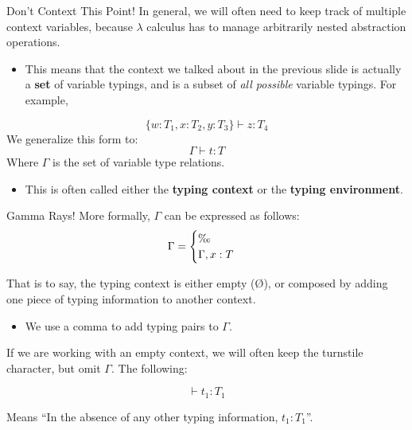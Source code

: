 \documentclass[11pt]{beamer}
\begin{document}
\begin{frame}[fragile=singleslide]{Don't Context This Point!}
In general, we will often need to keep track of multiple context variables, because $\lambda$ calculus has to manage arbitrarily nested abstraction operations.  
\begin{itemize}
\item This means that the context we talked about in the previous slide is actually a \textbf{set} of variable typings, and is a subset of \emph{all possible} variable typings.  For example,
\end{itemize}
\begin{equation}
\{ w : T_1, x : T_2,  y : T_3 \} \vdash z : T_4
\end{equation}
We generalize this form to:
\begin{equation}
\Gamma \vdash t : T
\end{equation}
Where $\Gamma$ is the set of variable type relations.
\begin{itemize}
\item This is often called either the \textbf{typing context} or the \textbf{typing environment}.
\end{itemize}
\end{frame}


\begin{frame}[fragile=singleslide]{Gamma Rays!}
More formally, $\Gamma$ can be expressed as follows: \\

\begin{equation}
\Gamma = \begin{cases}
\O \\
\Gamma , x : T \\
\end{cases}
\end{equation}

That is to say, the typing context is either empty (\O), or composed by adding one piece of typing information to another context.
\begin{itemize}
\item We use a comma to add typing pairs to $\Gamma$.
\end{itemize}
If we are working with an empty context, we will often keep the turnstile character, but omit $\Gamma$.  The following: 

\begin{equation}
\vdash t_1 : T_1
\end{equation}

Means ``In the absence of any other typing information, $t_1 : T_1$''. 
\end{frame}
\end{document}
